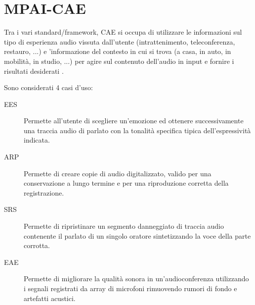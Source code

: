 \begin{adjustbox}{width=\textwidth}
\end{adjustbox} %


\section{MPAI-CAE} \label{sec:mpai-cae}
Tra i vari standard/framework, \ac{CAE} si occupa di utilizzare le informazioni sul tipo di esperienza audio vissuta dall'utente (intrattenimento, teleconferenza, restauro, ...) e 'informazione del contesto in cui si trova (a casa, in auto, in mobilità, in studio, ...) per agire sul contenuto dell'audio in input e fornire i risultati desiderati \cite{mpaiMPAICAE}.

Sono considerati 4 casi d'uso:
\begin{description}
    \item[\ac{EES}] Permette all'utente di scegliere un'emozione ed ottenere successivamente una traccia audio di parlato con la tonalità specifica tipica dell'espressività indicata.
    \item[\ac{ARP}] Permette di creare copie di audio digitalizzato, valido per una conservazione a lungo termine e per una riproduzione corretta della registrazione.
    \item[\ac{SRS}] Permette di ripristinare un segmento danneggiato di traccia audio contenente il parlato di un singolo oratore sintetizzando la voce della parte corrotta.
    \item[\ac{EAE}] Permette di migliorare la qualità sonora in un'audioconferenza utilizzando i segnali registrati da array di microfoni rimuovendo rumori di fondo e artefatti acustici.
\end{description}

